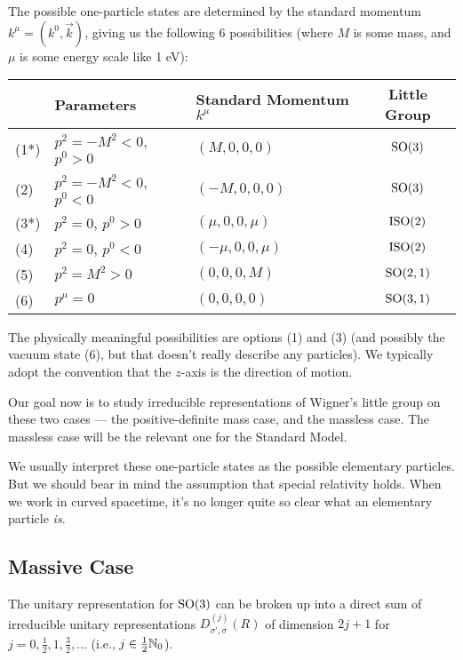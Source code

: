The possible one-particle states are determined by the standard momentum
$k^{\mu}=(k^{0},\vec{k})$, giving us the following 6 possibilities (where $M$ is some
mass, and $\mu$ is some energy scale like 1 eV):
\begin{center}
\begin{tabular}{ll|l|c}
    & Parameters & Standard Momentum $k^{\mu}$ & Little Group\\\hline
(1*) & $p^{2}=-M^{2}<0$, $p^{0}>0$ & $(M,0,0,0)$ & $\operatorname{SO}(3)$\\
(2) & $p^{2}=-M^{2}<0$, $p^{0}<0$ & $(-M,0,0,0)$ & $\operatorname{SO}(3)$\\
(3*) & $p^{2}=0$, $p^{0}>0$ & $(\mu,0,0,\mu)$ & $\mathrm{ISO}(2)$\\
(4) & $p^{2}=0$, $p^{0}<0$ & $(-\mu,0,0,\mu)$ & $\mathrm{ISO}(2)$\\
(5) & $p^{2}=M^{2}>0$ & $(0,0,0,M)$ & $\operatorname{SO}(2,1)$\\
(6) & $p^{\mu}=0$ & $(0,0,0,0)$ & $\operatorname{SO}(3,1)$
\end{tabular}
\end{center}
The physically meaningful possibilities are options (1) and (3) (and
possibly the vacuum state (6), but that doesn't really describe any particles).
We typically adopt the convention that the $z$-axis is the direction of motion.

Our goal now is to study irreducible representations of Wigner's little
group on these two cases --- the positive-definite mass case, and the
massless case. The massless case will be the relevant one for the
Standard Model.

\begin{ddanger}
We usually interpret these one-particle states as the possible
elementary particles. But we should bear in mind the assumption that
special relativity holds. When we work in curved spacetime, it's no
longer quite so clear what an elementary particle \emph{is}.
\end{ddanger}

\subsection*{Massive Case}

The unitary representation for $\operatorname{SO}(3)$ can be broken up into a direct
sum of irreducible unitary representations $D^{(j)}_{\sigma',\sigma}(R)$
of dimension $2j+1$ for $j=0,\frac{1}{2},1,\frac{3}{2},\dots$ (i.e.,
$j\in\frac{1}{2}\mathbb{N}_{0}$).

